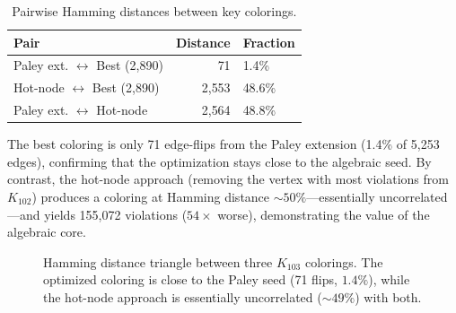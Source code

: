\documentclass[11pt,a4paper]{article}
\theoremstyle{plain}
\theoremstyle{remark}
\begin{document}
\begin{table}[H]
\centering
\caption{Pairwise Hamming distances between key colorings.}
\label{tab:hamming}
\small
\begin{tabular}{@{}lrl@{}}
\toprule
\textbf{Pair} & \textbf{Distance} & \textbf{Fraction} \\
\midrule
Paley ext. $\leftrightarrow$ Best (2{,}890) & 71 & 1.4\% \\
Hot-node $\leftrightarrow$ Best (2{,}890) & 2{,}553 & 48.6\% \\
Paley ext. $\leftrightarrow$ Hot-node & 2{,}564 & 48.8\% \\
\bottomrule
\end{tabular}
\end{table}

The best coloring is only 71 edge-flips from the Paley extension
(1.4\% of 5{,}253 edges), confirming that the optimization stays
close to the algebraic seed. By contrast, the hot-node approach
(removing the vertex with most violations from $K_{102}$) produces
a coloring at Hamming distance ${\sim}50\%$---essentially
uncorrelated---and yields 155{,}072 violations ($54\times$ worse),
demonstrating the value of the algebraic core.

\begin{figure}[H]
\centering
{}
\caption{Hamming distance triangle between three $K_{103}$ colorings.
  The optimized coloring is close to the Paley seed (71 flips,
  $1.4\%$), while the hot-node approach is essentially uncorrelated
  (${\sim}49\%$) with both.}
\label{fig:hamming-triangle}
\end{figure}
\end{document}
